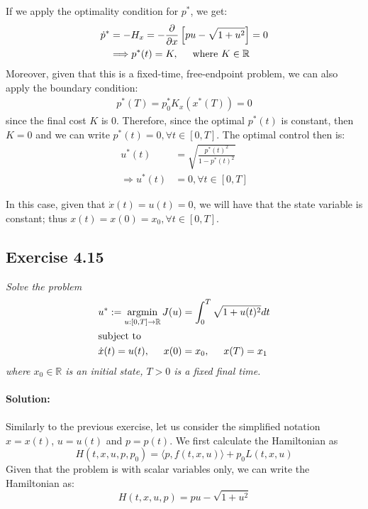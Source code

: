 If we apply the optimality condition for $p^*$, we get:
\begin{align}
    \Dot{p}^* &= - H_x = - \frac{\partial}{\partial x} \left[ pu - \sqrt{1+u^2} \right] = 0\\
    &\Longrightarrow p^*(t) = K, \hspace{0.5cm} \text{where } K \in \mathbb{R}
\end{align}
Moreover, given that this is a fixed-time, free-endpoint problem, we can also apply the boundary condition:
\begin{align}
    p^*(T) = p_0^* K_x(x^*(T)) = 0
\end{align}
since the final cost $K$ is 0. Therefore, since the optimal $p^*(t)$ is constant, then $K = 0$ and we can write $p^*(t) = 0, \forall t \in [0,T]$. The optimal control then is:
\begin{align}
    u^*(t) &= \sqrt{\frac{p^*(t)^2}{1-p^*(t)^2}}\\
    \Longrightarrow u^*(t) &= 0, \forall t \in [0, T]
\end{align}

In this case, given that $\Dot{x}(t) = u(t) = 0$, we will have that the state variable is constant; thus $x(t) = x(0) = x_0,  \forall t \in [0, T]$.


\subsection{Exercise 4.15}

\emph{Solve the problem}
\begin{align}
    &u^* := \operatorname*{argmin}_{u:[0,T] \to \mathbb{R}} J(u) = \int_0^T \sqrt{1 + u(t)^2}dt \\
    &\text{subject to}\\
    &\Dot{x}(t) = u(t), \hspace{0.5cm} x(0)=x_0, \hspace{0.5cm} x(T) = x_1
\end{align}
\emph{where $x_0 \in \mathbb{R}$ is an initial state, $T>0$ is a fixed final time.}
\\
\\
\textbf{Solution:}\\
\\
Similarly to the previous exercise, let us consider the simplified notation $x = x(t)$, $u = u(t)$ and $p = p(t)$. We first calculate the Hamiltonian as
\begin{equation}
\label{eq:hamiltonian}
    H(t, x, u, p, p_0) = \langle p, f(t, x, u) \rangle + p_0L(t, x, u)
\end{equation}
Given that the problem is with scalar variables only, we can write the Hamiltonian as: 
\begin{equation}
    H(t, x, u, p) = pu - \sqrt{1+u^2}
\end{equation}

